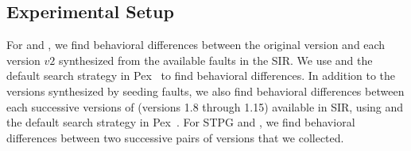 \subsection{Experimental Setup}

For  and , we find behavioral differences between the original version and each version $v2$ synthesized from the available faults in the SIR. We use  and the default search strategy in Pex~\cite{Pex, fitnex} to find behavioral differences. In addition to the versions synthesized by seeding faults, we also find behavioral differences between each successive versions of  (versions 1.8 through 1.15) available in SIR, using  and the default search strategy in Pex~\cite{Pex, fitnex}. For STPG and , we find behavioral differences between two successive pairs of versions that we collected. 


